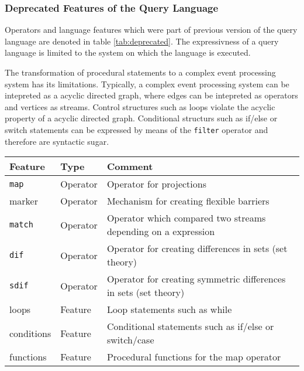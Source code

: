 \subsubsection{Deprecated Features of the Query Language}
Operators and language features which were part of previous version of the query
language are denoted in table \ref{tab:deprecated}. The expressivness of a query
language is limited to the system on which the language is executed.

The transformation of procedural statements to a complex event processing system
has its limitations. Typically, a complex event processing system can be 
intepreted as a acyclic directed graph, where edges can be intepreted as 
operators and vertices as streams. Control structures such as loops violate the
acyclic property of a acyclic directed graph. Conditional structurs such as 
if/else or switch statements can be expressed by means of the \texttt{filter}
operator and therefore are syntactic sugar. 
\begin{center}
  \begin{tabular}{|l|l|l|}
  \hline
  \textbf{Feature} & \textbf{Type} & \textbf{Comment} \\
  \hline
  \hline
  \texttt{map} & Operator & Operator for projections \\
  \hline
  marker & Operator & Mechanism for creating flexible barriers \\
  \hline
  \texttt{match} & Operator & Operator which compared two streams depending on a expression \\
  \hline
  \texttt{dif} & Operator & Operator for creating differences in sets (set theory) \\
  \hline
  \texttt{sdif} & Operator & Operator for creating symmetric differences in sets (set theory) \\
  \hline
  loops & Feature & Loop statements such as while  \\
  \hline
  conditions & Feature & Conditional statements such as if/else or switch/case \\
  \hline
  functions & Feature & Procedural functions for the map operator \\
  \hline
  \end{tabular}
  \label{tab:deprecated}
\end{center}

